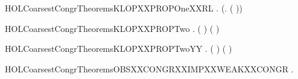 \newcommand{\HOLCoarsestCongrTheoremsKLOPXXPROPOneXXLR}{\UseVerbatim{HOLCoarsestCongrTheoremsKLOPXXPROPOneXXLR}}
\begin{SaveVerbatim}{HOLCoarsestCongrTheoremsKLOPXXPROPOneXXRL}
\HOLTokenTurnstile{} \HOLSymConst{\HOLTokenForall{}}  . (\HOLSymConst{\HOLTokenExists{}}.  \HOLSymConst{\HOLTokenLt{}}  \HOLSymConst{\HOLTokenConj{}} ( \HOLSymConst{=}   )) \HOLSymConst{\HOLTokenImp{}}    \HOLTokenTransBegin{} \HOLTokenTransEnd {}
\end{SaveVerbatim}
\newcommand{\HOLCoarsestCongrTheoremsKLOPXXPROPOneXXRL}{\UseVerbatim{HOLCoarsestCongrTheoremsKLOPXXPROPOneXXRL}}
\begin{SaveVerbatim}{HOLCoarsestCongrTheoremsKLOPXXPROPTwo}
\HOLTokenTurnstile{} \HOLSymConst{\HOLTokenForall{}}  .  \HOLSymConst{\HOLTokenLt{}}  \HOLSymConst{\HOLTokenImp{}} \HOLSymConst{\HOLTokenNeg{}} (  ) (  )
\end{SaveVerbatim}
\newcommand{\HOLCoarsestCongrTheoremsKLOPXXPROPTwo}{\UseVerbatim{HOLCoarsestCongrTheoremsKLOPXXPROPTwo}}
\begin{SaveVerbatim}{HOLCoarsestCongrTheoremsKLOPXXPROPTwoYY}
\HOLTokenTurnstile{} \HOLSymConst{\HOLTokenForall{}}  .  \HOLSymConst{\HOLTokenLt{}}  \HOLSymConst{\HOLTokenImp{}} \HOLSymConst{\HOLTokenNeg{}} (  ) (  )
\end{SaveVerbatim}
\newcommand{\HOLCoarsestCongrTheoremsKLOPXXPROPTwoYY}{\UseVerbatim{HOLCoarsestCongrTheoremsKLOPXXPROPTwoYY}}
\begin{SaveVerbatim}{HOLCoarsestCongrTheoremsOBSXXCONGRXXIMPXXWEAKXXCONGR}
\HOLTokenTurnstile{} \HOLSymConst{\HOLTokenForall{}} .    \HOLSymConst{\HOLTokenImp{}}   
\end{SaveVerbatim}
\newcommand{\HOLCoarsestCongrTheoremsOBSXXCONGRXXIMPXXWEAKXXCONGR}{\UseVerbatim{HOLCoarsestCongrTheoremsOBSXXCONGRXXIMPXXWEAKXXCONGR}}
